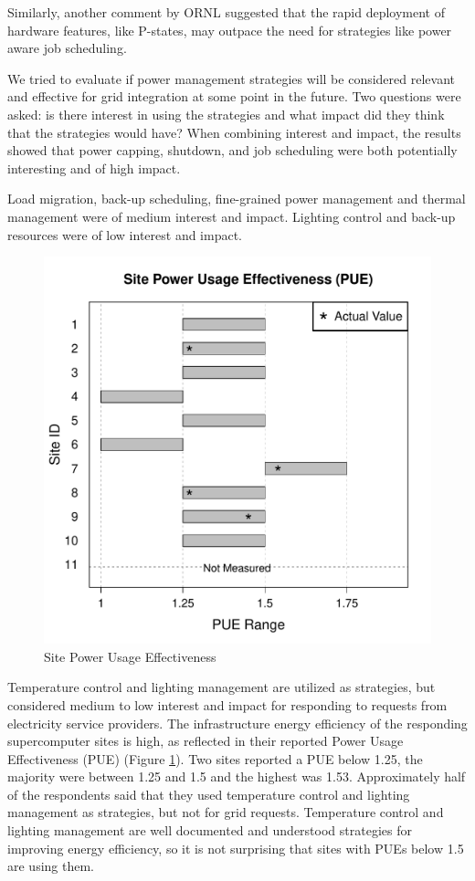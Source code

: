 Similarly, another comment by ORNL suggested that the rapid deployment of hardware features, like P-states,  
 may outpace the need for strategies like power aware job scheduling.

We tried to evaluate if power management strategies will be considered
relevant and effective for grid integration at some point in the future. Two
questions were asked: is there interest in using the strategies and what
impact did they think that the strategies would have? When combining
interest and impact, the results showed that power capping, shutdown, and
job scheduling were both potentially interesting and of high impact. 

Load migration, back-up
scheduling, fine-grained power management and thermal management were of medium
interest and impact. Lighting control and back-up resources were of low
interest and impact.  
\begin{figure}
\begin{center}
\includegraphics[scale=0.4]{NewGraphs/PUE-Graph.pdf}
\caption{Site Power Usage Effectiveness}
\label{figPUE}
\end{center}
\end{figure}

Temperature control and lighting management are utilized as strategies, but considered medium to low interest and impact
for responding to requests from electricity service providers. 
The infrastructure energy efficiency of the responding supercomputer sites is high, as reflected in their reported
Power Usage Effectiveness (PUE) (Figure \ref{figPUE}).  Two sites reported a PUE below 1.25, the majority were between 
1.25 and 1.5 and the highest was 1.53. Approximately half of the respondents said that they used 
temperature control and lighting management
as strategies, but not for grid requests.  Temperature control and lighting management are well documented and understood
strategies for improving energy efficiency, so it is not surprising that sites with PUEs below 1.5 are using them.

